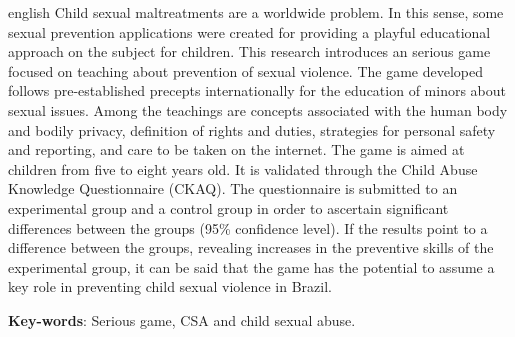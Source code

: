 \begin{resumo}[Abstract]
 \begin{otherlanguage*}{english}
	Child sexual maltreatments are a worldwide problem. In this sense, some sexual prevention applications were created for providing a playful educational approach on the subject for children. This research introduces an serious game focused on teaching about prevention of sexual violence. The game developed follows pre-established precepts internationally for the education of minors about sexual issues. Among the teachings are concepts associated with the human body and bodily privacy, definition of rights and duties, strategies for personal safety and reporting, and care to be taken on the internet. The game is aimed at children from five to eight years old. It is validated through the Child Abuse Knowledge Questionnaire (CKAQ). The questionnaire is submitted to an experimental group and a control group in order to ascertain significant differences between the groups (95\% confidence level). If the results point to a difference between the groups, revealing increases in the preventive skills of the experimental group, it can be said that the game has the potential to assume a key role in preventing child sexual violence in Brazil.
   \vspace{\onelineskip}
 
   \noindent 
   \textbf{Key-words}: Serious game, CSA and child sexual abuse.
 \end{otherlanguage*}
\end{resumo}

\listoffigures*
\cleardoublepage

\listoftables*
\cleardoublepage